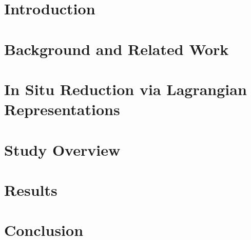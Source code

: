 \section{Introduction}
\label{sec:introduction}


\section{Background and Related Work}
\label{sec:related}


\section{In Situ Reduction via Lagrangian Representations}
\label{sec:method}


\section{Study Overview}
\label{sec:study}


\section{Results}
\label{sec:results}


\section{Conclusion}
\label{sec:conclusion}

